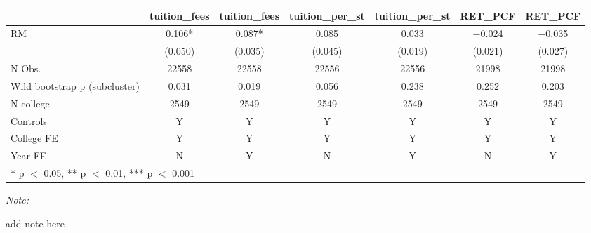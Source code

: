 \begin{table}
\centering
\begin{threeparttable}
\begin{tabular}[t]{lcccccc}
\toprule
  & tuition\_fees & tuition\_fees  & tuition\_per\_st & tuition\_per\_st  & RET\_PCF & RET\_PCF \\
\midrule
RM & \num{0.106}* & \num{0.087}* & \num{0.085} & \num{0.033} & \num{-0.024} & \num{-0.035}\\
 & (\num{0.050}) & (\num{0.035}) & (\num{0.045}) & (\num{0.019}) & (\num{0.021}) & (\num{0.027})\\
\midrule
N Obs. & \num{22558} & \num{22558} & \num{22556} & \num{22556} & \num{21998} & \num{21998}\\
Wild bootstrap p (subcluster) & 0.031 & 0.019 & 0.056 & 0.238 & 0.252 & 0.203\\
N college & 2549 & 2549 & 2549 & 2549 & 2549 & 2549\\
Controls & Y & Y & Y & Y & Y & Y\\
College FE & Y & Y & Y & Y & Y & Y\\
Year FE & N & Y & N & Y & N & Y\\
\bottomrule
\multicolumn{7}{l}{\rule{0pt}{1em}* p $<$ 0.05, ** p $<$ 0.01, *** p $<$ 0.001}\\
\end{tabular}
\begin{tablenotes}
\item \textit{Note: } 
\item add note here
\end{tablenotes}
\end{threeparttable}
\end{table}
